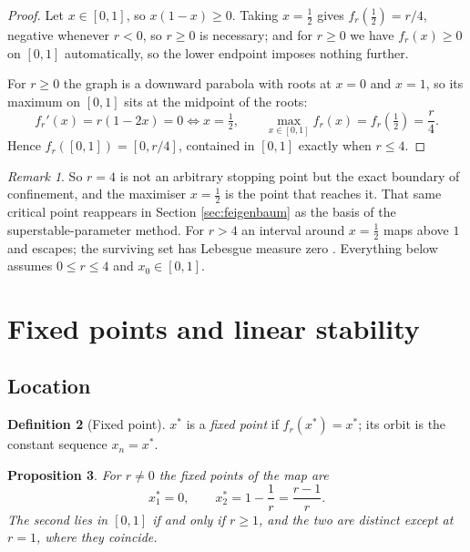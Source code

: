 \documentclass[11pt,a4paper]{article}
\newtheorem{proposition}{Proposition}[section]
\theoremstyle{definition}
\newtheorem{definition}[proposition]{Definition}
\theoremstyle{remark}
\newtheorem{remark}[proposition]{Remark}
\newcommand{\logmap}{f_r}
\begin{document}
\begin{proof}
Let $x\in[0,1]$, so $x(1-x)\ge0$. Taking $x=\tfrac12$ gives
$\logmap(\tfrac12)=r/4$, negative whenever $r<0$, so $r\ge0$ is necessary; and
for $r\ge0$ we have $\logmap(x)\ge0$ on $[0,1]$ automatically, so the lower
endpoint imposes nothing further.

For $r\ge0$ the graph is a downward parabola with roots at $x=0$ and $x=1$, so
its maximum on $[0,1]$ sits at the midpoint of the roots:
\begin{equation}
  \logmap'(x) = r(1-2x) = 0 \iff x=\tfrac12,
  \qquad
  \max_{x\in[0,1]}\logmap(x) = \logmap\!\left(\tfrac12\right) = \frac{r}{4} .
  \label{eq:maxvalue}
\end{equation}
Hence $\logmap([0,1])=[0,r/4]$, contained in $[0,1]$ exactly when $r\le4$.
\end{proof}

\begin{remark}
So $r=4$ is not an arbitrary stopping point but the exact boundary of
confinement, and the maximiser $x=\tfrac12$ is the point that reaches it. That
same critical point reappears in Section \ref{sec:feigenbaum} as the basis of
the superstable-parameter method. For $r>4$ an interval around $x=\tfrac12$
maps above $1$ and escapes; the surviving set has Lebesgue measure zero
\cite{Devaney2003}. Everything below assumes $0\le r\le4$ and $x_0\in[0,1]$.
\end{remark}

\section{Fixed points and linear stability}
\label{sec:stability}

\subsection{Location}

\begin{definition}[Fixed point]
$x^{*}$ is a \emph{fixed point} if $\logmap(x^{*})=x^{*}$; its orbit is the
constant sequence $x_n=x^{*}$.
\end{definition}

\begin{proposition}
\label{prop:fixed}
For $r\neq0$ the fixed points of the map are
\begin{equation}
  x_1^{*}=0, \qquad x_2^{*}=1-\frac{1}{r}=\frac{r-1}{r} .
  \label{eq:fixedpoints}
\end{equation}
The second lies in $[0,1]$ if and only if $r\ge1$, and the two are distinct
except at $r=1$, where they coincide.
\end{proposition}
\end{document}
